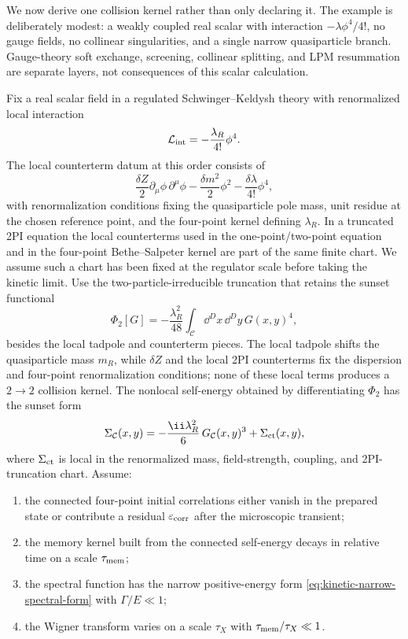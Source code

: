 We now derive one collision kernel rather than only declaring it.  The example
is deliberately modest: a weakly coupled real scalar with interaction
\(-\lambda\phi^4/4!\), no gauge fields, no collinear singularities, and a
single narrow quasiparticle branch.  Gauge-theory soft exchange, screening,
collinear splitting, and LPM resummation are separate layers, not consequences
of this scalar calculation.

\begin{controlledapproximation}
\label{ca:kinetic-scalar-2pi-kb-regime}
Fix a real scalar field in a regulated Schwinger--Keldysh theory with
renormalized local interaction
\[
  \mathcal L_{\rm int}=-\frac{\lambda_R}{4!}\phi^4 .
\]
The local counterterm datum at this order consists of
\[
  \frac{\delta Z}{2}\partial_\mu\phi\,\partial^\mu\phi
  -\frac{\delta m^2}{2}\phi^2
  -\frac{\delta\lambda}{4!}\phi^4 ,
\]
with renormalization conditions fixing the quasiparticle pole mass, unit
residue at the chosen reference point, and the four-point kernel defining
\(\lambda_R\).  In a truncated 2PI equation the local counterterms used in the
one-point/two-point equation and in the four-point Bethe--Salpeter kernel are
part of the same finite chart.  We assume such a chart has been fixed at the
regulator scale before taking the kinetic limit.
Use the two-particle-irreducible truncation that retains the sunset functional
\begin{equation}
  \Phi_2[G]
  =
  -\frac{\lambda_R^2}{48}
  \int_{\mathcal C}\dd^Dx\,\dd^Dy\,
  G(x,y)^4,
  \label{eq:kinetic-scalar-2pi-sunset-functional}
\end{equation}
besides the local tadpole and counterterm pieces.  The local tadpole shifts
the quasiparticle mass \(m_R\), while \(\delta Z\) and the local 2PI
counterterms fix the dispersion and four-point renormalization conditions;
none of these local terms produces a \(2\to2\) collision kernel.
The nonlocal self-energy obtained by differentiating
\(\Phi_2\) has the sunset form
\begin{equation}
  \Sigma_{\mathcal C}(x,y)
  =
  -\frac{\ii\lambda_R^2}{6}\,G_{\mathcal C}(x,y)^3
  +\Sigma_{\rm ct}(x,y),
  \label{eq:kinetic-scalar-sunset-self-energy}
\end{equation}
where \(\Sigma_{\rm ct}\) is local in the renormalized mass, field-strength,
coupling, and 2PI-truncation chart.
Assume:
\begin{enumerate}
\item the connected four-point initial correlations either vanish in the
      prepared state or contribute a residual
      \(\varepsilon_{\rm corr}\) after the microscopic transient;
\item the memory kernel built from the connected self-energy decays in
      relative time on a scale \(\tau_{\rm mem}\);
\item the spectral function has the narrow positive-energy form
      \eqref{eq:kinetic-narrow-spectral-form} with
      \(\Gamma/E\ll1\);
\item the Wigner transform varies on a scale \(\tau_X\) with
      \(\tau_{\rm mem}/\tau_X\ll1\).
\end{enumerate}
\end{controlledapproximation}

